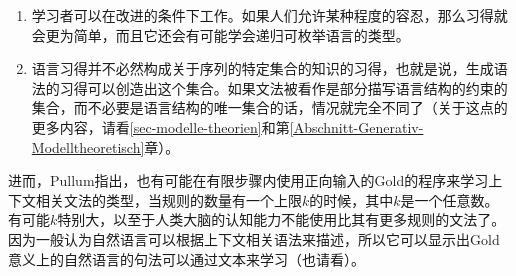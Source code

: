 \begin{enumerate}
\item 学习者可以在改进的条件下工作。如果人们允许某种程度的容忍，那么习得就会更为简单，而且它还会有可能学会递归可枚举语言的类型\citep{Wharton74a}。

\item 语言习得并不必然构成关于序列的特定集合的知识的习得，也就是说，生成语法的习得可以创造出这个集合。如果文法被看作是部分描写语言结构的约束的集合，而不必要是语言结构的唯一集合的话，情况就完全不同了（关于这点的更多内容，请看\ref{sec-modelle-theorien}和第\ref{Abschnitt-Generativ-Modelltheoretisch}章）。
\end{enumerate}

\noindent
进而，Pullum指出，也有可能在有限步骤内使用正向输入的Gold的程序来学习上下文相关文法的类型，当规则的数量有一个上限$k$的时候，其中$k$是一个任意数。
有可能$k$特别大，以至于人类大脑的认知能力不能使用比其有更多规则的文法了。
因为一般认为自然语言可以根据上下文相关语法来描述，所以它可以显示出Gold意义上的自然语言的句法可以通过文本来学习（也请看\citealp[--196]{SP2002b}）。

